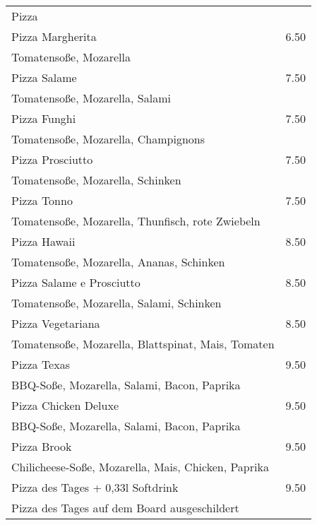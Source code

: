 \documentclass[12pt]{article}
\makeatletter
\newcommand*\ColText[1]{\textcolor{Goldenrod3}{#1}}
\newenvironment{Group}[1]
{\noindent\begin{tabular*}{\textwidth}{@{}p{.8\linewidth}@{\extracolsep{\fill}}r@{}}
{\fontsize{24}{29}\selectfont\ColText{#1}}\\[0.8em]}
{\end{tabular*}}
\newcommand*\Entry[2]{%
    \sffamily#1 & #2}
\newcommand*\Expl[1]{%
    \hspace*{1em}\footnotesize #1}
\makeatother
\begin{document}
    \begin{Group}{Pizza}
        \Entry{Pizza Margherita}{6.50} \\
        \Expl{Tomatensoße, Mozarella} \\
        \Entry{Pizza Salame}{7.50} \\
        \Expl{Tomatensoße, Mozarella, Salami} \\
        \Entry{Pizza Funghi}{7.50} \\
        \Expl{Tomatensoße, Mozarella, Champignons} \\
        \Entry{Pizza Prosciutto}{7.50} \\
        \Expl{Tomatensoße, Mozarella, Schinken} \\
        \Entry{Pizza Tonno}{7.50} \\
        \Expl{Tomatensoße, Mozarella, Thunfisch, rote Zwiebeln} \\
        \Entry{Pizza Hawaii}{8.50} \\
        \Expl{Tomatensoße, Mozarella, Ananas, Schinken} \\
        \Entry{Pizza Salame e Prosciutto}{8.50} \\
        \Expl{Tomatensoße, Mozarella, Salami, Schinken} \\
        \Entry{Pizza Vegetariana}{8.50} \\
        \Expl{Tomatensoße, Mozarella, Blattspinat, Mais, Tomaten} \\
        \Entry{Pizza Texas}{9.50} \\
        \Expl{BBQ-Soße, Mozarella, Salami, Bacon, Paprika} \\
        \Entry{Pizza Chicken Deluxe}{9.50} \\
        \Expl{BBQ-Soße, Mozarella, Salami, Bacon, Paprika} \\
        \Entry{Pizza Brook}{9.50} \\
        \Expl{Chilicheese-Soße, Mozarella, Mais, Chicken, Paprika} \\
        \Entry{Pizza des Tages + 0,33l Softdrink}{9.50}\\
        \Expl{Pizza des Tages auf dem Board ausgeschildert} \\

    \end{Group}
\end{document}
